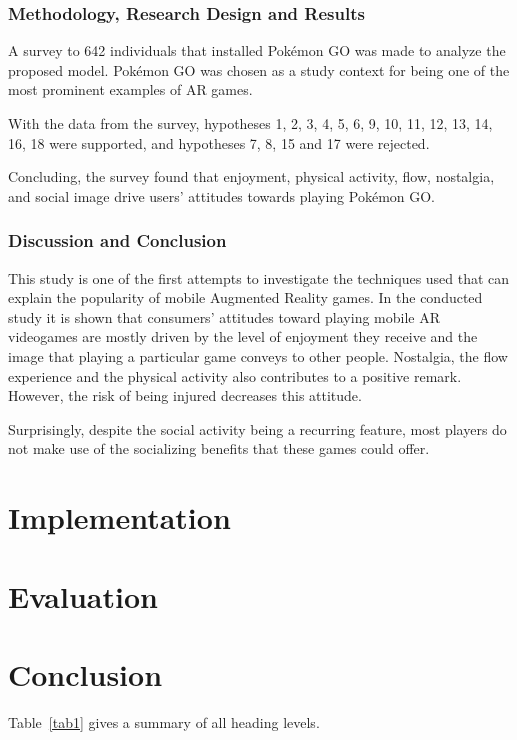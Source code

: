 \documentclass[runningheads]{llncs}
\begin{document}
\subsubsection{Methodology, Research Design and Results}
\par A survey to 642 individuals that installed Pokémon GO was made to analyze the proposed model. Pokémon GO was chosen as a study context for being one of the most prominent examples of AR games.
\par With the data from the survey, hypotheses 1, 2, 3, 4, 5, 6, 9, 10, 11, 12, 13, 14, 16, 18 were supported, and hypotheses 7, 8, 15 and 17 were rejected.
\par Concluding, the survey found that enjoyment, physical activity, flow, nostalgia, and social image drive users' attitudes towards playing Pokémon GO.

\subsubsection{Discussion and Conclusion}
\par This study is one of the first attempts to investigate the techniques used that can explain the popularity of mobile Augmented Reality games. In the conducted study it is shown that consumers' attitudes toward playing mobile AR videogames are mostly driven by the level of enjoyment they receive and the image that playing a particular game conveys to other people. Nostalgia, the flow experience and the physical activity also contributes to a positive remark. However, the risk of being injured decreases this attitude. 
\par Surprisingly, despite the social activity being a recurring feature, most players do not make use of the socializing benefits that these games could offer.

\section{Implementation}
\section{Evaluation}
\section{Conclusion} 


Table~\ref{tab1} gives a summary of all heading levels.
\end{document}

